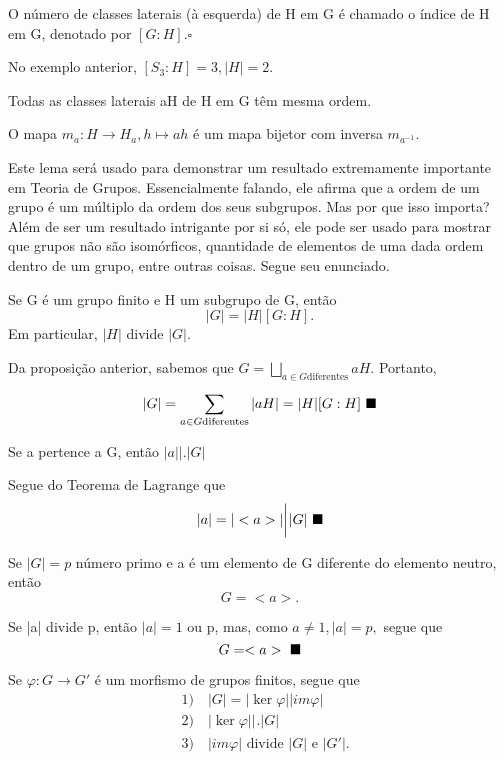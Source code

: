 \documentclass[algebra_notes.tex]{subfiles}
\begin{document}
\begin{def*}
	O número de classes laterais (\`a esquerda) de H em G é chamado o índice de H em G, denotado por $[G:H].\square$
\end{def*}
\begin{example*}
	No exemplo anterior, $[S_{3} : H]=3, |H| = 2.$
\end{example*}
\begin{lemma*}
	Todas as classes laterais aH de H em G têm mesma ordem.
\end{lemma*}
\begin{proof*}
	O mapa $m_{a}:H\rightarrow H_{a}, h\mapsto ah$ é um mapa bijetor com inversa $m_{a^{-1}}.$ \qedsymbol
\end{proof*}
Este lema será usado para demonstrar um resultado extremamente importante em Teoria de Grupos. Essencialmente falando,
ele afirma que a ordem de um grupo é um múltiplo da ordem dos seus subgrupos. Mas por que isso importa? Além de ser um
resultado intrigante por si só, ele pode ser usado para mostrar que grupos não são isomórficos, quantidade de elementos de
uma dada ordem dentro de um grupo, entre outras coisas. Segue seu enunciado.
\begin{theorem*}
	Se G é um grupo finito e H um subgrupo de G, então
	$$
		|G| = |H|[G:H].
	$$
	Em particular, $|H|$ divide $|G|.$
\end{theorem*}
\begin{proof*}
	Da proposição anterior, sabemos que $G = \bigsqcup_{a\in{G}\text{diferentes}}^{}{aH}.$ Portanto,
	$$
		|G| = \sum\limits_{a\in{G}\text{diferentes}}^{}|aH| = |H|[G:H]\text{ $\blacksquare$}
	$$
\end{proof*}
\begin{crl*}
	Se a pertence a G, então $|a|\biggl|\biggr.|G|$
\end{crl*}
\begin{proof*}
	Segue do Teorema de Lagrange que
	$$
		|a|=|<a>|\biggl|_{}^{}\biggr.|G|\text{ $\blacksquare$}
	$$
\end{proof*}
\begin{crl*}
	Se $|G|=p$ número primo e a é um elemento de G diferente do elemento neutro, então
	$$
		G = <a>.
	$$
\end{crl*}
\begin{proof*}
	Se |a| divide p, então $|a|=1$ ou p, mas, como $a\neq 1, |a| = p,$ segue que
	$$
		G = <a>\text{ $\blacksquare$}
	$$
\end{proof*}
\begin{crl*}
	Se $\varphi:G\rightarrow G'$ é um morfismo de grupos finitos, segue que
	\begin{align*}
		 & 1)\quad |G| = |\ker{\varphi}||im\varphi|              \\
		 & 2)\quad |\ker{\varphi}| \biggl|_{}^{}\biggr. |G|      \\
		 & 3)\quad |im\varphi|\text{ divide } |G|\text{ e }|G'|.
	\end{align*}
\end{crl*}
\end{document}
